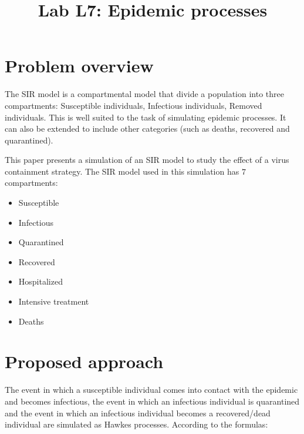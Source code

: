 \documentclass[conference]{IEEEtran}
\begin{document}
\title{
Lab L7: Epidemic processes
}

\author{
}

\maketitle
    

\section{Problem overview}

The SIR model is a compartmental model that divide a population into three compartments: Susceptible individuals, Infectious individuals, Removed individuals.
%
This is well suited to the task of simulating epidemic processes.
%
It can also be extended to include other categories (such as deaths, recovered and quarantined).

This paper presents a simulation of an SIR model to study the effect of a virus containment strategy.
%
The SIR model used in this simulation has $7$ compartments: 
\begin{itemize}
    \item Susceptible
    \item Infectious
    \item Quarantined
    \item Recovered
    \item Hospitalized
    \item Intensive treatment
    \item Deaths
\end{itemize}

\section{Proposed approach}

The event in which a susceptible individual comes into contact with the epidemic and becomes infectious, the event in which an infectious individual is quarantined and the event in which an infectious individual becomes a recovered/dead individual are simulated as Hawkes processes.
%
According to the formulas:
\end{document}
